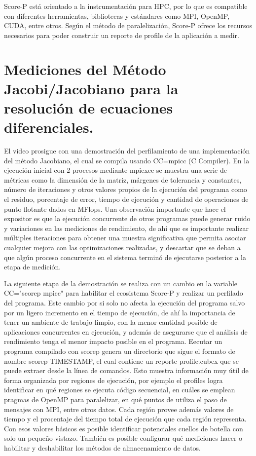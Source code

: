 \documentclass[conference]{IEEEtran}
\begin{document}
Score-P está orientado a la instrumentación para HPC, por lo que es compatible con diferentes herramientas, bibliotecas y estándares como MPI, OpenMP, CUDA, entre otros. Según el método de paralelización, Score-P ofrece los recursos necesarios para poder construir un reporte de profile de la aplicación a medir.

\section{Mediciones del Método Jacobi/Jacobiano para la resolución de ecuaciones diferenciales.}

El video prosigue con una demostración del perfilamiento de una implementación del método Jacobiano, el cual se compila usando CC=mpicc (C Compiler). En la ejecución inicial con 2 procesos mediante mpiexec se muestra una serie de métricas como la dimensión de la matriz, márgenes de tolerancia y constantes, número de iteraciones y otros valores propios de la ejecución del programa como el residuo, porcentaje de error, tiempo de ejecución y cantidad de operaciones de punto flotante dados en MFlops. Una observación importante que hace el expositor es que la ejecución concurrente de otros programas puede generar ruido y variaciones en las mediciones de rendimiento, de ahí que es importante realizar múltiples iteraciones para obtener una muestra significativa que permita asociar cualquier mejora con las optimizaciones realizadas, y descartar que se deban a que algún proceso concurrente en el sistema terminó de ejecutarse posterior a la etapa de medición.

La siguiente etapa de la demostración se realiza con un cambio en la variable CC="scorep mpicc" para habilitar el ecosistema Score-P y realizar un perfilado del programa. Este cambio por si solo no afecta la ejecución del programa salvo por un ligero incremento en el tiempo de ejecución, de ahí la importancia de tener un ambiente de trabajo limpio, con la menor cantidad posible de aplicaciones concurrentes en ejecución, y además de asegurarse que el análisis de rendimiento tenga el menor impacto posible en el programa. Eecutar un programa compilado con scorep genera un directorio que sigue el formato de nombre scorep-TIMESTAMP, el cual contiene un reporte profile.cubex que se puede extraer desde la línea de comandos. Esto muestra información muy útil de forma organizada por regiones de ejecución, por ejemplo el profiles logra identificar en qué regiones se ejecuta código secuencial, en cuáles se emplean pragmas de OpenMP para paralelizar, en qué puntos de utiliza el paso de mensajes con MPI, entre otros datos. Cada región provee además valores de tiempo y el procentaje del tiempo total de ejecución que cada región representa. Con esos valores básicos es posible identificar potenciales cuellos de botella con solo un pequeño vistazo. También es posible configurar qué mediciones hacer o habilitar y deshabilitar los métodos de almacenamiento de datos.
\end{document}
